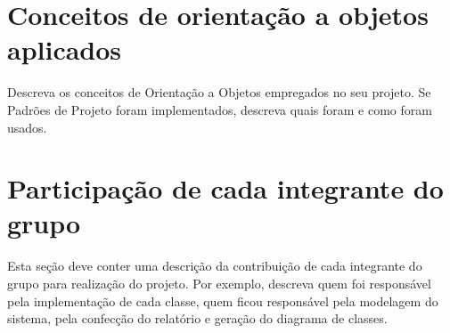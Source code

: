 \documentclass[]{article}
\begin{document}
\section{Conceitos de orientação a objetos aplicados}
Descreva os conceitos de Orientação a Objetos empregados no seu projeto. Se Padrões de Projeto foram implementados, descreva quais foram e como foram usados.

\section{Participação de cada integrante do grupo}
Esta seção deve conter uma descrição da contribuição de cada integrante do grupo para realização do projeto. Por exemplo, descreva quem foi responsável pela implementação de cada classe, quem ficou responsável pela modelagem do sistema, pela confecção do relatório e geração do diagrama de classes.
\end{document}
